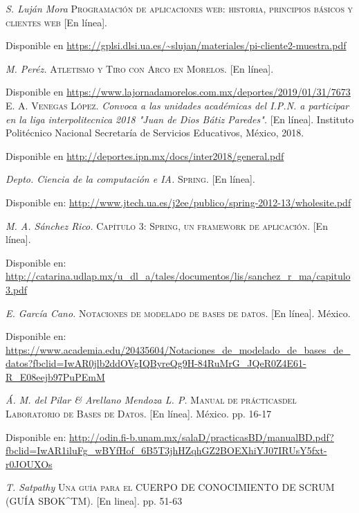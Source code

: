 
\begin{thebibliography}{}

		\textit{S. Luján Mora}
		\textsc{Programación de aplicaciones web: historia, principios básicos y clientes web} [En línea].
		 

		Disponible en 
		\url{https://gplsi.dlsi.ua.es/~slujan/materiales/pi-cliente2-muestra.pdf}

		\textit{M. Peréz.}
		\textsc{Atletismo y Tiro con Arco en Morelos.} [En línea].
		 

		Disponible en 
		\url{https://www.lajornadamorelos.com.mx/deportes/2019/01/31/7673}
		\textsc{E. A. Venegas López.}
		\textit{Convoca a las unidades académicas del I.P.N. a participar en la liga interpolitecnica 2018 "Juan de Dios Bátiz Paredes".} [En línea]. Instituto Politécnico Nacional Secretaría de Servicios Educativos, México, 2018.
		 

		Disponible en
		\url{http://deportes.ipn.mx/docs/inter2018/general.pdf}


		\textit{Depto. Ciencia de la computación e IA.}
		\textsc{Spring.} [En línea]. 
	    

		Disponible en:
		\url{http://www.jtech.ua.es/j2ee/publico/spring-2012-13/wholesite.pdf}

		\textit{M. A. Sánchez Rico.}
		\textsc{Capítulo 3: Spring, un framework de aplicación.} [En línea].
		 

		Disponible en:
		\url{http://catarina.udlap.mx/u_dl_a/tales/documentos/lis/sanchez_r_ma/capitulo3.pdf}

		\textit{E. García Cano.}
		\textsc{Notaciones de modelado de bases de datos.} [En línea]. México.
		 

		Disponible en:
		\url{https://www.academia.edu/20435604/Notaciones_de_modelado_de_bases_de_datos?fbclid=IwAR0jlb2ddOVgIQByreQg9H-84RuMrG_JQeR0Z4E61-R_E08eejb97PuPEmM}

		\textit{Á. M. del Pilar \& Arellano Mendoza L. P.}
		\textsc{Manual de prácticasdel Laboratorio de Bases de Datos.} [En línea]. México. pp. 16-17
		 

		Disponible en: 
		\url{http://odin.fi-b.unam.mx/salaD/practicasBD/manualBD.pdf?fbclid=IwAR1iluFg_wBYfHof_6B5T3jhHZqhGZ2BOEXhiYJ07IRUsY5fxt-r0JOUXOs}	

	
		\textit{T. Satpathy}
		\textsc{Una guía para el CUERPO DE CONOCIMIENTO DE SCRUM (GUÍA SBOK^{TM}).} [En linea]. pp. 51-63 
		


\end{thebibliography}
